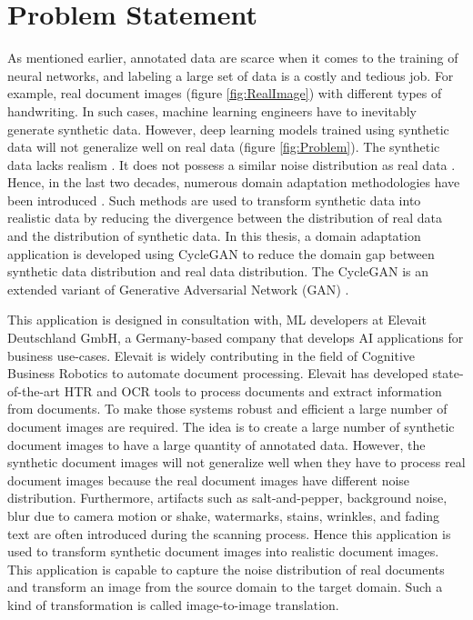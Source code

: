\section{Problem Statement}\label{ProblemStatement}

As mentioned earlier, annotated data are scarce when it comes to the training of neural networks, and labeling a large set of data is a costly and tedious job. For example, real document images (figure \ref{fig:RealImage}) with different types of handwriting. In such cases, machine learning engineers have to inevitably generate synthetic data. However, deep learning models trained using synthetic data will not generalize well on real data \cite{8978087} (figure \ref{fig:Problem}). The synthetic data lacks realism \cite{8978087}. It does not possess a similar noise distribution as real data \cite{8978087}. Hence, in the last two decades, numerous domain adaptation methodologies have been introduced \cite{8978011}. Such methods are used to transform synthetic data into realistic data by reducing the divergence between the distribution of real data and the distribution of synthetic data. In this thesis, a domain adaptation application is developed using \ac{CycleGAN} \cite{zhu2020unpaired} to reduce the domain gap between synthetic data distribution and real data distribution. The \ac{CycleGAN} is an extended variant of Generative Adversarial Network (\ac{GAN}) \cite{goodfellow2014generative}. 

This application is designed in consultation with, \ac{ML} developers at Elevait Deutschland GmbH, a Germany-based company that develops \ac{AI} applications for business use-cases. Elevait is widely contributing in the field of Cognitive Business Robotics \cite{Metta2012} to automate document processing. Elevait has developed state-of-the-art \ac{HTR} and \ac{OCR} tools to process documents and extract information from documents. To make those systems robust and efficient a large number of document images are required. The idea is to create a large number of synthetic document images to have a large quantity of annotated data. However, the synthetic document images will not generalize well when they have to process real document images because the real document images have different noise distribution. Furthermore, artifacts such as salt-and-pepper, background noise, blur due to camera motion or shake, watermarks, stains, wrinkles, and fading text are often introduced during the scanning process. Hence this application is used to transform synthetic document images into realistic document images. This application is capable to capture the noise distribution of real documents and transform an image from the source domain to the target domain. Such a kind of transformation is called image-to-image translation.


